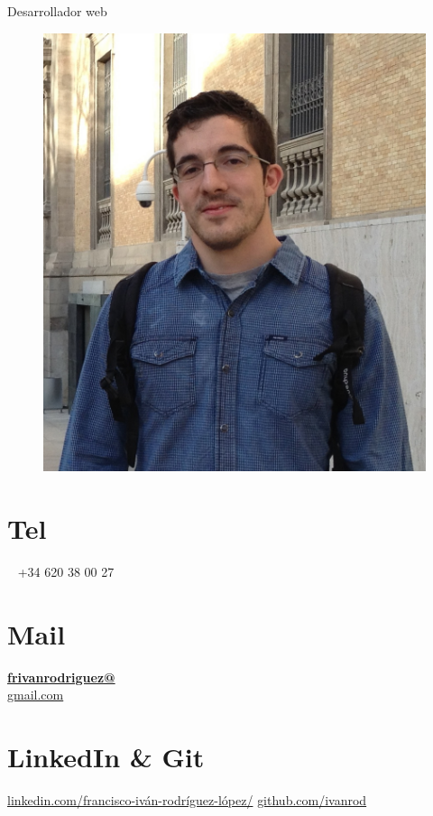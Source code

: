 \documentclass[]{friggeri-cv}
\begin{document}
      {Desarrollador web}
      

\begin{aside}
  \begin{figure}
    \includegraphics[width=0.6\columnwidth]{foto.png}
  \end{figure}
  
  \section{Tel}%
   ~
    +34 620 38 00 27
    ~
  \section{Mail}
    \href{mailto:frivanrodriguez@gmail.com}{\textbf{frivanrodriguez@}\\gmail.com}
    ~
  \section{LinkedIn \& Git}
    \href{es.linkedin.com/pub/francisco-iván-rodríguez-lópez/}{linkedin.com/francisco-iván-rodríguez-lópez/}
    \href{https://github.com/ivanrod}{github.com/ivanrod}
    ~

\end{aside}
\end{document}
